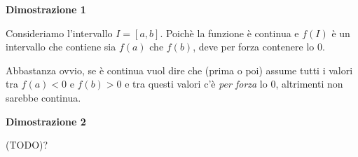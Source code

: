\textbf{Dimostrazione 1}

Consideriamo l'intervallo $I=[a,b]$. Poichè la funzione è continua e $f(I)$ è un intervallo che contiene sia $f(a)$ che $f(b)$, deve per forza contenere lo 0.

\begin{tip}
Abbastanza ovvio, se è continua vuol dire che (prima o poi) assume tutti i valori tra $f(a)<0$ e $f(b)>0$ e tra questi valori c'è \textit{per forza} lo 0, altrimenti non sarebbe continua.
\end{tip}

\textbf{Dimostrazione 2}

(TODO)?